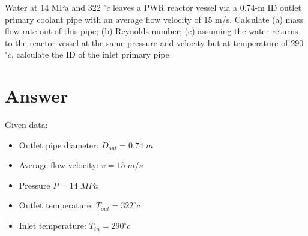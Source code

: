 \documentclass[12pt]{article}
\begin{document}
Water at 14 MPa and 322 $^\circ c$ leaves a PWR reactor vessel via a 0.74-m ID outlet primary  coolant pipe with an average flow velocity of 15 m/s. Calculate (a) mass flow rate out of this  pipe; (b) Reynolds number; (c) assuming the water returns to the reactor vessel at the same  pressure and velocity but at temperature of 290 $^\circ c$, calculate the ID of the inlet primary pipe

\section*{Answer}
Given data:
\begin{itemize}
    \item Outlet pipe diameter: $D_{out} = 0.74 \; m$
    \item Average flow velocity: $v=15 \; m/s$
    \item Pressure $P=14 \; MPa$
    \item Outlet temperature: $T_{out} = 322 ^{\circ} c$
    \item Inlet temperature: $T_{in} = 290 ^{\circ} c$
\end{itemize}
\end{document}
